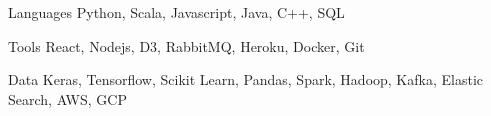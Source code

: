 


\begin{cvskills}


\cvskill
{Languages} %
{Python, Scala, Javascript, Java, C++, SQL} %


\cvskill
{Tools}
{React, Nodejs, D3, RabbitMQ, Heroku, Docker, Git}


\cvskill
{Data}
{Keras, Tensorflow, Scikit Learn, Pandas, Spark, Hadoop, Kafka, Elastic Search, AWS, GCP}





\end{cvskills}
